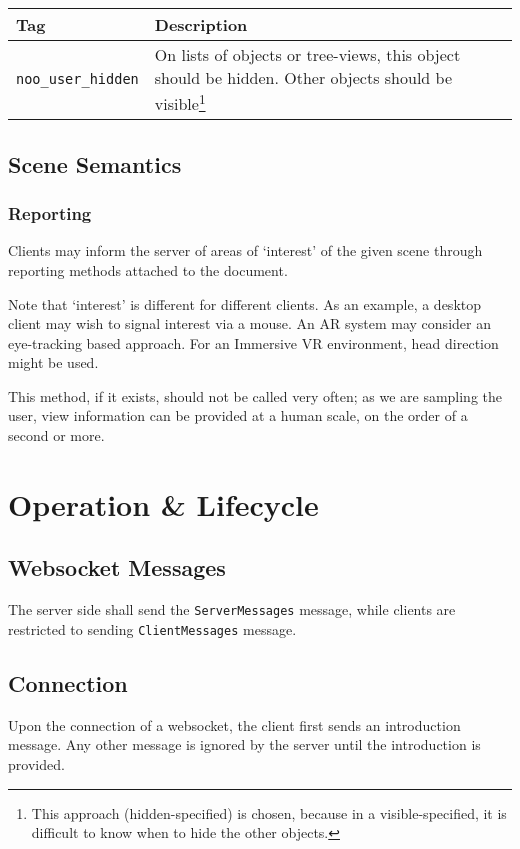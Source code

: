 \documentclass[11pt, oneside]{amsart}
\begin{document}
\begin{tabularx}{.9\textwidth}{p{1.5in}X}
	\toprule
	\textbf{Tag} & \textbf{Description} \\
	\midrule
	\texttt{noo\_user\_hidden} & On lists of objects or tree-views, this object should be hidden. Other objects should be visible\footnote{This approach (hidden-specified) is chosen, because in a visible-specified, it is difficult to know when to hide the other objects.} \\
	\bottomrule
\end{tabularx}

\subsection{Scene Semantics}


\subsubsection{Reporting}

Clients may inform the server of areas of `interest' of the given scene through reporting methods attached to the document.



Note that `interest' is different for different clients. As an example, a desktop client may wish to signal interest via a mouse. An AR system may consider an eye-tracking based approach. For an Immersive VR environment, head direction might be used.

This method, if it exists, should not be called very often; as we are sampling the user, view information can be provided at a human scale, on the order of a second or more.


\section{Operation \& Lifecycle}

\subsection{Websocket Messages}
The server side shall send the \texttt{ServerMessages} message, while clients are restricted to sending \texttt{ClientMessages} message.

\subsection{Connection}
Upon the connection of a websocket, the client first sends an introduction message. Any other message is ignored by the server until the introduction is provided.
\end{document}
